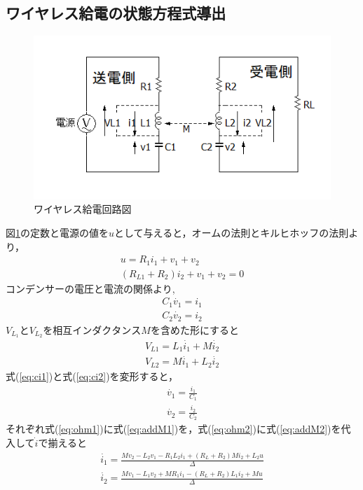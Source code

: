 \documentclass[12pt]{jarticle}
\begin{document}
\subsection{ワイヤレス給電の状態方程式導出}
\begin{figure}[h]
	\centering
	\includegraphics[]{wpt_2020128.png}
	\caption{ワイヤレス給電回路図}
	\label{fig:wpt_kairo2}
\end{figure}
図\ref{fig:wpt_kairo2}の定数と電源の値を$u$として与えると，オームの法則とキルヒホッフの法則より，
\setcounter{equation}{0}
\begin{eqnarray}
\label{eq:ohm1}
u=R_1i_1+v_1+v_2\\
\label{eq:ohm2}
(R_{L1}+R_2)i_2+v_1+v_2=0
\end{eqnarray}
 コンデンサーの電圧と電流の関係より,
\begin{eqnarray}
\label{eq:ci1}
C_1\dot{v_1}=i_1\\
\label{eq:ci2}
C_2\dot{v_2}=i_2
\end{eqnarray}
$V_{L_1}とV_{L_2}を相互インダクタンスMを含めた形にすると$
\begin{eqnarray}
\label{eq:addM1}
V_{L1}=L_1\dot{i_1}+M\dot{i_2}\\
\label{eq:addM2}
V_{L2}=M\dot{i_1}+L_2\dot{i_2}
\end{eqnarray}
式(\ref{eq:ci1})と式(\ref{eq:ci2})を変形すると，
\begin{eqnarray}
\dot{v_1}=\frac{i_1}{C_1}\\
\dot{v_2}=\frac{i_2}{C_2}
\end{eqnarray}
それぞれ式(\ref{eq:ohm1})に式(\ref{eq:addM1})を，式(\ref{eq:ohm2})に式(\ref{eq:addM2})を代入して$\dot{i}$で揃えると
\begin{eqnarray}
\label{eq:doti1}
\dot{i_1}=\frac{Mv_2-L_2v_1-R_1L_2i_1+(R_L+R_2)Mi_2+L_2u}{\Delta}\\
\label{eq:doti2}
\dot{i_2}=\frac{Mv_1-L_1v_2+MR_1i_1-(R_L+R_2)L_1i_2+Mu}{\Delta}
\end{eqnarray}
\end{document}
